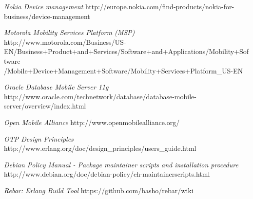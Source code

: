 \documentclass[10pt]{article}
\begin{document}
\begin{thebibliography}{99}

\emph{Nokia Device management}
http://europe.nokia.com/find-products/nokia-for-business/device-management

\emph{Motorola Mobility Services Platform (MSP)}
http://www.motorola.com/Business/US-EN/Business+Product+and+Services/Software+and+Applications/Mobility+Software\\
/Mobile+Device+Management+Software/Mobility+Services+Platform\_US-EN

\emph{Oracle Database Mobile Server 11g}
http://www.oracle.com/technetwork/database/database-mobile-server/overview/index.html

\emph{Open Mobile Alliance}
http://www.openmobilealliance.org/

\emph{OTP Design Principles}
http://www.erlang.org/doc/design\_principles/users\_guide.html

\emph{Debian Policy Manual - Package maintainer scripts and installation procedure}
http://www.debian.org/doc/debian-policy/ch-maintainerscripts.html

\emph{Rebar: Erlang Build Tool}
https://github.com/basho/rebar/wiki

\end{thebibliography}
\end{document}
